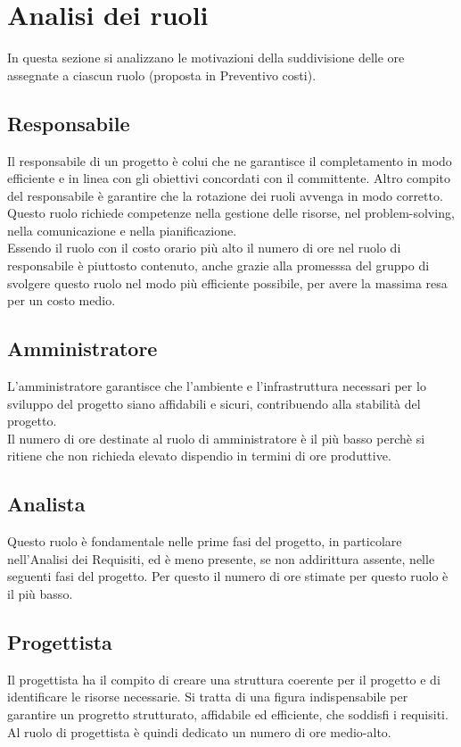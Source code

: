 \section{Analisi dei ruoli}
In questa sezione si analizzano le motivazioni della suddivisione delle ore assegnate a ciascun ruolo (proposta in Preventivo costi). 


\subsection{Responsabile}
Il responsabile di un progetto è colui che ne garantisce il completamento in modo efficiente e in linea con gli obiettivi concordati con il committente. Altro compito del responsabile è garantire che la rotazione dei ruoli avvenga in modo corretto. Questo ruolo richiede competenze nella gestione delle risorse, nel problem-solving, nella comunicazione e nella pianificazione. 
\\
Essendo il ruolo con il costo orario più alto il numero di ore nel ruolo di responsabile è piuttosto contenuto, anche grazie alla promesssa del gruppo di svolgere questo ruolo nel modo più efficiente possibile, per avere la massima resa per un costo medio.

\subsection{Amministratore}

L'amministratore garantisce che l'ambiente e l'infrastruttura necessari per lo sviluppo del progetto siano affidabili e sicuri, contribuendo alla stabilità del progetto.
\\
Il numero di ore destinate al ruolo di amministratore è il più basso perchè si ritiene che non richieda elevato dispendio in termini di ore produttive.

\subsection{Analista}
Questo ruolo è fondamentale nelle prime fasi del progetto, in particolare nell'Analisi dei Requisiti, ed è meno presente, se non addirittura assente, nelle seguenti fasi del progetto. Per questo il numero di ore stimate per questo ruolo è il più basso.

\subsection{Progettista}
Il progettista ha il compito di creare una struttura coerente per il progetto e di identificare le risorse necessarie. Si tratta di una figura indispensabile per garantire un progretto strutturato, affidabile ed efficiente, che soddisfi i requisiti.
\\
Al ruolo di progettista è quindi dedicato un numero di ore medio-alto.


